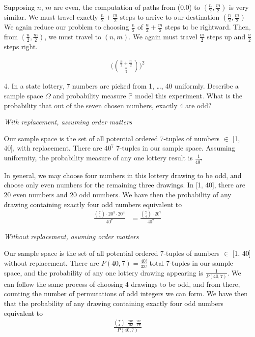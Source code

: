 \documentclass{article}
\begin{document}
\vspace{5mm}

Supposing $n$, $m$ are even, the computation of paths from (0,0) to $(\frac{n}{2}, \frac{m}{2})$ is very similar.
We must travel exactly $\frac{n}{2} + \frac{m}{2}$ steps to arrive to our destination
$(\frac{n}{2}, \frac{m}{2})$ We again reduce our problem to choosing $\frac{n}{2}$ of 
$\frac{n}{2} + \frac{m}{2}$ steps to be rightward. Then, from $(\frac{n}{2}, \frac{m}{2})$, we must
travel to $(n, m)$. We again must travel $\frac{m}{2}$ steps up and $\frac{n}{2}$ steps right.


\begin{align*}
    \bigg(\binom{\frac{n}{2}+\frac{m}{2}}{\frac{n}{2}}\bigg)^{2}
\end{align*}

4. In a state lottery, 7 numbers are picked from 1, \ldots, 40 uniformly. Describe a sample
space $\Omega$ and probability measure $\mathbb{P}$ model this experiment. What is the probability
that out of the seven chosen numbers, exactly 4 are odd?

\vspace{5mm}

\emph{With replacement, assuming order matters}

\vspace{5mm}

Our sample space is the set of all potential ordered 7-tuples of numbers $\in$ [1, 40], with replacement. There are $40^7$ 7-tuples
in our sample space. Assuming uniformity, the probability measure of any one lottery result is 
$\frac{1}{40^{7}}$

\vspace{5mm}

In general, we may choose four numbers in this lottery drawing to be odd, and choose only even numbers for the
remaining three drawings. In [1, 40], there are 20 even numbers and 20 odd numbers. We have then the
probability of any drawing containing exactly four odd numbers equivalent to
\begin{align*}
\frac{\binom{7}{4}\cdot20^{3}\cdot20^{4}}{40^{7}} &= \frac{\binom{7}{4}\cdot20^{7}}{40^{7}}
\end{align*}
\vspace{5mm}

\emph{Without replacement, asuming order matters}

\vspace{5mm}

Our sample space is the set of all potential ordered 7-tuples of numbers $\in$ [1, 40] without replacement. There are
$P(40, 7) = \frac{40!}{33!}$ total 7-tuples in our sample space, and the probability of any one lottery
drawing appearing is $\frac{1}{P(40, 7)}$. We can follow the same process of choosing 4 drawings to be odd,
and from there, counting the number of permutations of odd integers we can form. We have then that the probability of any
drawing containing exactly four odd numbers equivalent to 
\begin{align*}
    \frac{\binom{7}{4}\cdot\frac{20!}{16!}\cdot\frac{20!}{17!}}{P(40, 7)}
\end{align*}
\end{document}
